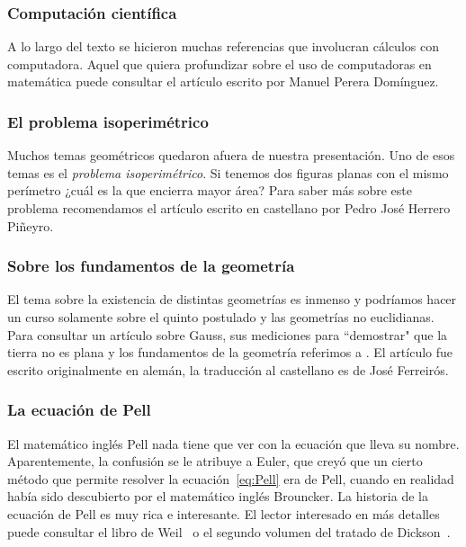 \subsubsection*{Computación científica}

A lo largo del texto se hicieron muchas referencias que involucran cálculos
con computadora. Aquel que quiera profundizar sobre 
el uso de computadoras en matemática puede consultar
el artículo \cite{pd_ENIAC} escrito por Manuel Perera Domínguez. 

\subsubsection*{El problema isoperimétrico}

Muchos temas geométricos quedaron afuera de nuestra presentación. Uno de esos
temas es el \emph{problema isoperimétrico}. Si tenemos dos figuras planas
con el mismo perímetro ¿cuál es la que encierra mayor área? Para 
saber más sobre este problema 
recomendamos el artículo \cite{hp_isoperimetric} 
escrito en castellano por Pedro Jos{\'e} Herrero Pi{\~n}eyro. 

\subsubsection*{Sobre los fundamentos de la geometría}

El tema sobre la existencia de distintas geometrías es inmenso y podríamos
hacer un curso solamente sobre el quinto postulado y las geometrías no euclidianas. 
Para consultar un 
artículo sobre Gauss, sus mediciones para ``demostrar" que la tierra
no es plana y los fundamentos de la geometría
referimos a \cite{scholz_triangulos}. El artículo fue escrito originalmente 
en alemán, la traducción al castellano
es de José Ferreirós.

\subsubsection*{La ecuación de Pell}

El matemático inglés Pell nada tiene que ver con la ecuación que lleva su nombre.
Aparentemente, la confusión se le atribuye a Euler, 
que creyó que un cierto método que permite
resolver la ecuación~\eqref{eq:Pell} era de Pell, 
cuando en realidad había sido descubierto
por el matemático inglés Brouncker.  La historia de la ecuación de Pell es muy
rica e interesante. El lector interesado en más detalles puede consultar el
libro de Weil~\cite{MR734177} o el segundo volumen del tratado de
Dickson~\cite{MR0245500}.

